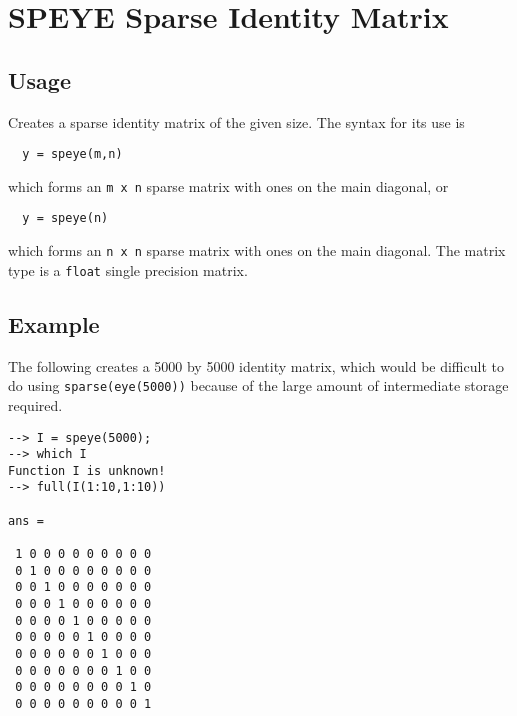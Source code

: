 \section{SPEYE Sparse Identity Matrix}

\subsection{Usage}

Creates a sparse identity matrix of the given size.  The syntax for
its use is
\begin{verbatim}
  y = speye(m,n)
\end{verbatim}
which forms an \verb|m x n| sparse matrix with ones on the main diagonal,
or
\begin{verbatim}
  y = speye(n)
\end{verbatim}
which forms an \verb|n x n| sparse matrix with ones on the main diagonal.  The
matrix type is a \verb|float| single precision matrix.
\subsection{Example}

The following creates a 5000 by 5000 identity matrix, which would be
difficult to do using \verb|sparse(eye(5000))| because of the large amount
of intermediate storage required.
\begin{verbatim}
--> I = speye(5000);
--> which I
Function I is unknown!
--> full(I(1:10,1:10))

ans = 

 1 0 0 0 0 0 0 0 0 0 
 0 1 0 0 0 0 0 0 0 0 
 0 0 1 0 0 0 0 0 0 0 
 0 0 0 1 0 0 0 0 0 0 
 0 0 0 0 1 0 0 0 0 0 
 0 0 0 0 0 1 0 0 0 0 
 0 0 0 0 0 0 1 0 0 0 
 0 0 0 0 0 0 0 1 0 0 
 0 0 0 0 0 0 0 0 1 0 
 0 0 0 0 0 0 0 0 0 1 
\end{verbatim}
